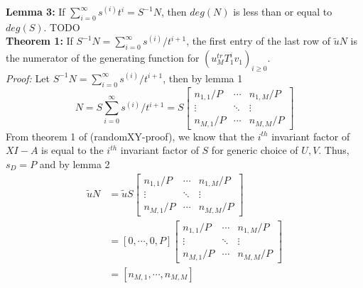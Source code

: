 \documentclass[12pt]{article}
\begin{document}
\bigskip
\noindent\textbf{Lemma 3:} If $\sum_{i = 0}^{\infty} s^{(i)} t^i = S^{-1}N$, then $deg(N)$ is
less than or equal to $deg(S)$. TODO\\

\noindent\textbf{Theorem 1:} If 
$S^{-1}N = \sum_{i=0}^{\infty} s^{(i)}/t^{i+1}$, the first entry
of the last row of $\tilde{u} N$ is  the numerator of the generating function for 
$(u_{M}^{tr} T_1^i v_{1})_{i \ge 0}$.\\

\noindent\textit{Proof:} Let $S^{-1}N = \sum_{i=0}^{\infty} s^{(i)}/t^{i+1}$, 
then by lemma 1 
$$ N = S \sum_{i=0}^{\infty} s^{(i)}/t^{i+1} = S 
\begin{bmatrix}
n_{1,1} / P & \cdots & n_{1,M} / P \\
\vdots      & \ddots & \vdots \\
n_{M,1} / P & \cdots & n_{M,M} / P
\end{bmatrix}
$$
From theorem 1 of (randomXY-proof), we know that the $i^{th}$ invariant factor of
$XI - A$ is equal to the $i^{th}$ invariant factor of $S$ for generic choice of
$U,V$. Thus, $s_D = P$ and by lemma 2
\begin{align*}
\tilde{u} N &= \tilde{u} S
				\begin{bmatrix}
				n_{1,1} / P & \cdots & n_{1,M} / P \\
				\vdots            & \ddots & \vdots \\
				n_{M,1} / P & \cdots & n_{M,M} / P
				\end{bmatrix} \\
            &= [0,\cdots,0,P]
               \begin{bmatrix}
               n_{1,1} / P & \cdots & n_{1,M} / P \\
               \vdots            & \ddots & \vdots \\
               n_{M,1} / P & \cdots & n_{M,M} / P
               \end{bmatrix}\\
            &= [n_{M,1} , \cdots , n_{M,M}]
\end{align*}
\end{document}
